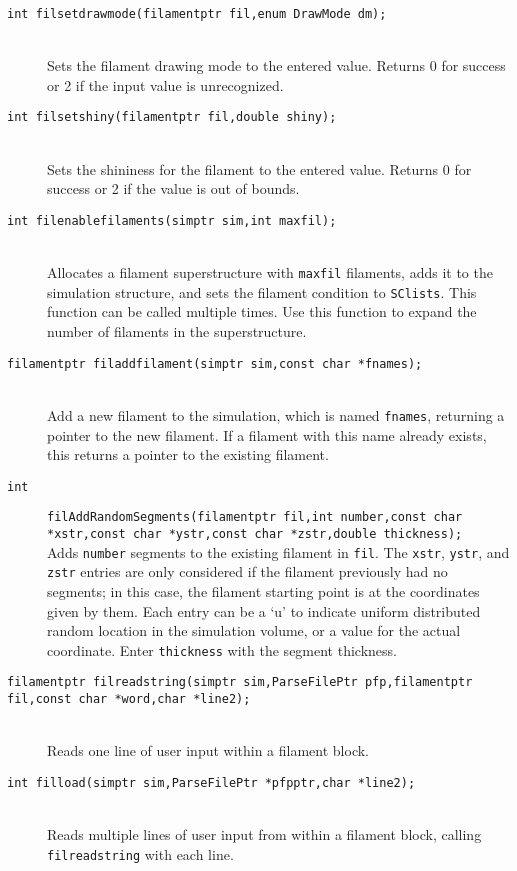 \documentclass {book}
\newcommand {\ttt} {\texttt}
\begin{document}
\begin{description}
\item[\ttt{int filsetdrawmode(filamentptr fil,enum DrawMode dm);}]
\hfill \\
Sets the filament drawing mode to the entered value. Returns 0 for success or 2 if the input value is unrecognized.

\item[\ttt{int filsetshiny(filamentptr fil,double shiny);}]
\hfill \\
Sets the shininess for the filament to the entered value. Returns 0 for success or 2 if the value is out of bounds.

\item[\ttt{int filenablefilaments(simptr sim,int maxfil);}]
\hfill \\
Allocates a filament superstructure with \ttt{maxfil} filaments, adds it to the simulation structure, and sets the filament condition to \ttt{SClists}. This function can be called multiple times. Use this function to expand the number of filaments in the superstructure.

\item[\ttt{filamentptr filaddfilament(simptr sim,const char *fnames);}]
\hfill \\
Add a new filament to the simulation, which is named \ttt{fnames}, returning a pointer to the new filament. If a filament with this name already exists, this returns a pointer to the existing filament.

\item[\ttt{int}]
\ttt{filAddRandomSegments(filamentptr fil,int number,const char *xstr,const char *ystr,const char *zstr,double thickness);}
\hfill \\
Adds \ttt{number} segments to the existing filament in \ttt{fil}. The \ttt{xstr}, \ttt{ystr}, and \ttt{zstr} entries are only considered if the filament previously had no segments; in this case, the filament starting point is at the coordinates given by them. Each entry can be a `u' to indicate uniform distributed random location in the simulation volume, or a value for the actual coordinate. Enter \ttt{thickness} with the segment thickness.

\item[\ttt{filamentptr filreadstring(simptr sim,ParseFilePtr pfp,filamentptr fil,const char *word,char *line2);}]
\hfill \\
Reads one line of user input within a filament block.

\item[\ttt{int filload(simptr sim,ParseFilePtr *pfpptr,char *line2);}]
\hfill \\
Reads multiple lines of user input from within a filament block, calling \ttt{filreadstring} with each line.


\end{description}
\end{document}
